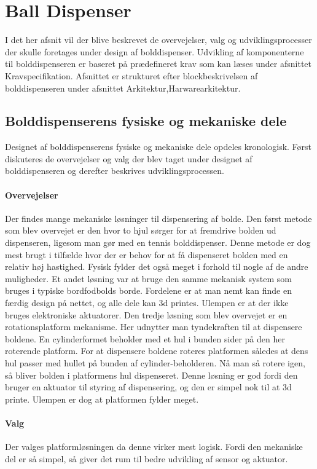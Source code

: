 \documentclass[Rapport/Rapport_main.tex]{subfiles}
\begin{document}
\section{Ball Dispenser}
I det her afsnit vil der blive beskrevet de overvejelser, valg og udviklingsprocesser der skulle foretages under design af bolddispenser. Udvikling af komponenterne til bolddispenseren er baseret på prædefineret krav som kan læses under afsnittet Kravspecifikation. Afsnittet er strukturet efter blockbeskrivelsen af bolddispenseren under afsnittet Arkitektur,Harwarearkitektur.
\subsection{Bolddispenserens fysiske og mekaniske dele}
Designet af bolddispenserens fysiske og mekaniske dele opdeles kronologisk. Først diskuteres de overvejelser og valg der blev taget under designet af bolddispenseren og derefter beskrives udviklingsprocessen.

\paragraph{Overvejelser}
\newline\newline
Der findes mange mekaniske løsninger til dispensering af bolde. Den først metode som blev overvejet er den hvor to hjul sørger for at fremdrive bolden ud dispenseren, ligesom man gør med en tennis bolddispenser. Denne metode er dog mest brugt i tilfælde hvor der er behov for at få dispenseret bolden med en relativ høj hastighed. Fysisk fylder det også meget i forhold til nogle af de andre muligheder. Et andet løsning var at bruge den samme mekanisk system som bruges i typiske bordfodbolds borde. Fordelene er at man nemt kan finde en færdig design på nettet, og alle dele kan 3d printes. Ulempen er at der ikke bruges elektroniske aktuatorer.
Den tredje løsning som blev overvejet er en rotationsplatform mekanisme. Her udnytter man tyndekraften til at dispensere boldene. En cylinderformet beholder med et hul i bunden sider på den her roterende platform. For at dispensere boldene roteres platformen således at dens hul passer med hullet på bunden af cylinder-beholderen. Nå man så rotere igen, så bliver bolden i platformens hul dispenseret. Denne løsning er god fordi den bruger en aktuator til styring af dispensering, og den er simpel nok til at 3d printe. Ulempen er dog at platformen fylder meget.

\paragraph{Valg}
\newline\newline
Der valges platformløsningen da denne virker mest logisk. Fordi den mekaniske del er så simpel, så giver det rum til bedre udvikling af sensor og aktuator.
\end{document}
